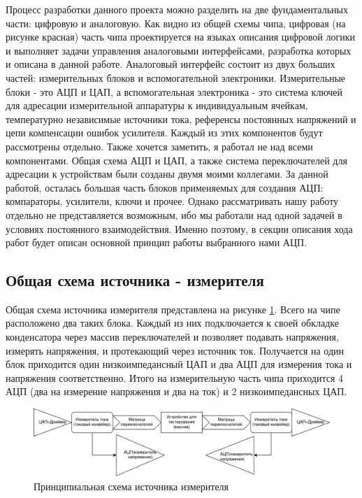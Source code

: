 \documentclass[a4paper,12pt]{article} %
\begin{document}
Процесс разработки данного проекта  можно разделить на две фундаментальных части: цифровую и аналоговую. Как видно из общей схемы чипа, цифровая (на рисунке красная) часть чипа проектируется на языках описания цифровой логики и выполняет задачи управления аналоговыми интерфейсами, разработка которых и описана в данной работе. Аналоговый интерфейс состоит из  двух больших частей: измерительных блоков и вспомогательной электроники. Измерительные блоки -  это АЦП и ЦАП, а вспомогательная электроника -  это система ключей для адресации измерительной аппаратуры к индивидуальным ячейкам, температурно независимые источники тока, референсы постоянных напряжений и цепи компенсации ошибок усилителя. Каждый из этих компонентов будут рассмотрены отдельно. Также хочется заметить, я работал не над всеми компонентами. Общая схема АЦП и ЦАП, а также система переключателей для адресации к устройствам были созданы двумя моими коллегами. За данной работой, осталась большая часть блоков применяемых для создания АЦП: компараторы, усилители, ключи и прочее. Однако рассматривать нашу работу отдельно не представляется возможным, ибо мы работали над одной задачей в условиях постоянного взаимодействия. Именно поэтому, в секции описания хода работ будет описан основной принцип работы выбранного нами АЦП. 



\subsection{Общая схема источника - измерителя}


Общая схема источника измерителя представлена на рисунке \ref{pic:SMU}. Всего на чипе расположено два таких блока. Каждый из них подключается к своей обкладке конденсатора через массив переключателей  и позволяет подавать напряжения, измерять напряжения, и протекающий через источник ток. Получается на один блок приходится один низкоимпедансный ЦАП и два АЦП для измерения тока и напряжения соответственно. Итого на измерительную часть чипа приходится 4 АЦП (два на измерение напряжения и два на ток) и 2 низкоимпедансных ЦАП. 


\begin{figure}[]
    \includegraphics[width=\textwidth]{SMU.png}
    \caption{Принципиальная схема источника измерителя}
    \label{pic:SMU}
\end{figure}
\end{document}

